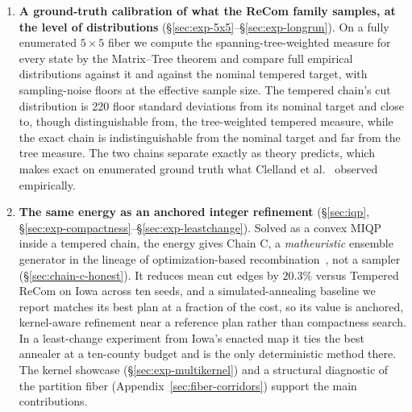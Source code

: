 \documentclass[11pt]{article}
\begin{document}
\begin{enumerate}
  \item \textbf{A ground-truth calibration of what the ReCom family
    samples, at the level of distributions}
    (\S\ref{sec:exp-5x5}--\S\ref{sec:exp-longrun}). On a fully
    enumerated $5 \times 5$ fiber we compute the spanning-tree-weighted
    measure for every state by the Matrix--Tree theorem and compare full
    empirical distributions against it and against the nominal tempered
    target, with sampling-noise floors at the effective sample size.
    The tempered chain's cut distribution is 220 floor standard
    deviations from its nominal target and close to, though
    distinguishable from, the tree-weighted tempered measure, while the
    exact chain is indistinguishable from the nominal target and far
    from the tree measure. The two chains separate exactly as theory
    predicts, which makes exact on enumerated ground truth what
    Clelland et al.~\cite{clelland2021compactness} observed
    empirically.

  \item \textbf{The same energy as an anchored integer refinement}
    (\S\ref{sec:iqp}, \S\ref{sec:exp-compactness}--\S\ref{sec:exp-leastchange}).
    Solved as a convex MIQP inside a tempered chain, the energy gives
    Chain C, a \emph{matheuristic} ensemble generator in the lineage
    of optimization-based
    recombination~\cite{brous2025recom,cannon2023voting}, not a
    sampler (\S\ref{sec:chain-c-honest}). It reduces mean cut edges
    by $20.3\%$ versus Tempered ReCom on Iowa across ten seeds, and
    a simulated-annealing baseline we report matches its best plan
    at a fraction of the cost, so its value is anchored, kernel-aware
    refinement near a reference plan rather than compactness search.
    In a least-change experiment from Iowa's enacted map it ties the
    best annealer at a ten-county budget and is the only
    deterministic method there. The kernel showcase
    (\S\ref{sec:exp-multikernel}) and a structural diagnostic of the
    partition fiber (Appendix~\ref{sec:fiber-corridors}) support the
    main contributions.
\end{enumerate}
\end{document}
